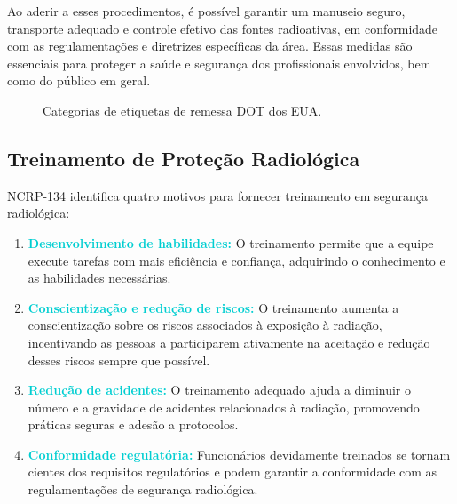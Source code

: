 \documentclass[11pt,a4paper]{article}
\begin{document}
	Ao aderir a esses procedimentos, é possível garantir um manuseio seguro, transporte adequado e controle efetivo das fontes radioativas, em conformidade com as regulamentações e diretrizes específicas da área. Essas medidas são essenciais para proteger a saúde e segurança dos profissionais envolvidos, bem como do público em geral.

		\begin{figure}[!h]
			\centering
			\caption{Categorias de etiquetas de remessa DOT dos EUA.}
			\label{fig:prEmbalados}
		\end{figure}

\subsection*{Treinamento de Proteção Radiológica}

	NCRP-134 identifica quatro motivos para fornecer treinamento em segurança radiológica:

	\begin{enumerate}
			\item \textcolor{DarkTurquoise}{\textbf{Desenvolvimento de habilidades:}} O treinamento permite que a equipe execute tarefas com mais eficiência e confiança, adquirindo o conhecimento e as habilidades necessárias.
			
			\item \textcolor{DarkTurquoise}{\textbf{Conscientização e redução de riscos:}} O treinamento aumenta a conscientização sobre os riscos associados à exposição à radiação, incentivando as pessoas a participarem ativamente na aceitação e redução desses riscos sempre que possível.
			
			\item \textcolor{DarkTurquoise}{\textbf{Redução de acidentes:}} O treinamento adequado ajuda a diminuir o número e a gravidade de acidentes relacionados à radiação, promovendo práticas seguras e adesão a protocolos.
			
			\item \textcolor{DarkTurquoise}{\textbf{Conformidade regulatória:}} Funcionários devidamente treinados se tornam cientes dos requisitos regulatórios e podem garantir a conformidade com as regulamentações de segurança radiológica.
		\end{enumerate}
\end{document}
